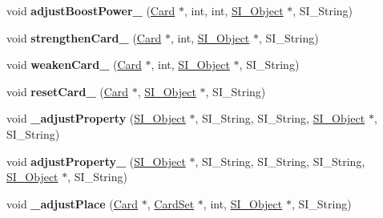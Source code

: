 \begin{DoxyCompactItemize}
\mbox{\label{class_field_aaae73d69aaa1cb5aad00484ed9ce6586}} 
void {\bfseries adjust\+Boost\+Power\+\_\+} (\hyperlink{class_card}{Card} $\ast$, int, int, \hyperlink{class_s_i___object}{S\+I\+\_\+\+Object} $\ast$, S\+I\+\_\+\+String)
\item 
\mbox{\label{class_field_ad0f65b89ffd91f3aa8aa799aef2e6047}} 
void {\bfseries strengthen\+Card\+\_\+} (\hyperlink{class_card}{Card} $\ast$, int, \hyperlink{class_s_i___object}{S\+I\+\_\+\+Object} $\ast$, S\+I\+\_\+\+String)
\item 
\mbox{\label{class_field_a7d40832908002f6409cb12d1fd016d3e}} 
void {\bfseries weaken\+Card\+\_\+} (\hyperlink{class_card}{Card} $\ast$, int, \hyperlink{class_s_i___object}{S\+I\+\_\+\+Object} $\ast$, S\+I\+\_\+\+String)
\item 
\mbox{\label{class_field_a4300601ffa2827c566c3cb443c72ecf6}} 
void {\bfseries reset\+Card\+\_\+} (\hyperlink{class_card}{Card} $\ast$, \hyperlink{class_s_i___object}{S\+I\+\_\+\+Object} $\ast$, S\+I\+\_\+\+String)
\item 
\mbox{\label{class_field_a2eeae06fb4f3d41a817002130b2c4f2a}} 
void {\bfseries \+\_\+adjust\+Property} (\hyperlink{class_s_i___object}{S\+I\+\_\+\+Object} $\ast$, S\+I\+\_\+\+String, S\+I\+\_\+\+String, \hyperlink{class_s_i___object}{S\+I\+\_\+\+Object} $\ast$, S\+I\+\_\+\+String)
\item 
\mbox{\label{class_field_adb1848f229231acf8aa09d7b05d54d35}} 
void {\bfseries adjust\+Property\+\_\+} (\hyperlink{class_s_i___object}{S\+I\+\_\+\+Object} $\ast$, S\+I\+\_\+\+String, S\+I\+\_\+\+String, S\+I\+\_\+\+String, \hyperlink{class_s_i___object}{S\+I\+\_\+\+Object} $\ast$, S\+I\+\_\+\+String)
\item 
\mbox{\label{class_field_abed423933bd92ba4f2c5aa787ec09726}} 
void {\bfseries \+\_\+adjust\+Place} (\hyperlink{class_card}{Card} $\ast$, \hyperlink{class_card_set}{Card\+Set} $\ast$, int, \hyperlink{class_s_i___object}{S\+I\+\_\+\+Object} $\ast$, S\+I\+\_\+\+String)
\item 
\mbox{\label{class_field_aabc5eb64105cfea79573714c43d36efb}} 

\end{DoxyCompactItemize}
